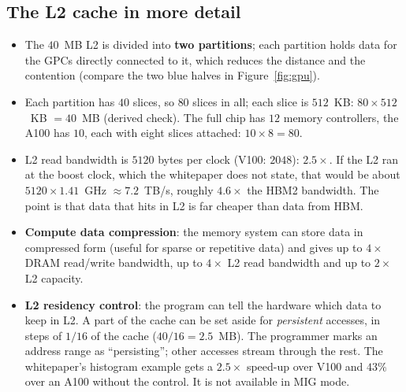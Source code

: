 \subsection{The L2 cache in more detail}
\begin{itemize}
  \item The $40$~MB L2 is divided into \textbf{two partitions}; each partition holds data for the GPCs directly connected to it, which reduces the distance and the contention (compare the two blue halves in Figure~\ref{fig:gpu}).
  \item Each partition has $40$ slices, so $80$ slices in all; each slice is $512$~KB: $80\times512$~KB $=40$~MB (derived check). The full chip has $12$ memory controllers, the A100 has $10$, each with eight slices attached: $10\times8=80$.
  \item L2 read bandwidth is $5120$ bytes per clock (V100: $2048$): $2.5\times$. If the L2 ran at the boost clock, which the whitepaper does not state, that would be about $5120\times1.41$~GHz $\approx7.2$~TB/s, roughly $4.6\times$ the HBM2 bandwidth. The point is that data that hits in L2 is far cheaper than data from HBM.
  \item \textbf{Compute data compression}: the memory system can store data in compressed form (useful for sparse or repetitive data) and gives up to $4\times$ DRAM read/write bandwidth, up to $4\times$ L2 read bandwidth and up to $2\times$ L2 capacity.
  \item \textbf{L2 residency control}: the program can tell the hardware which data to keep in L2. A part of the cache can be set aside for \emph{persistent} accesses, in steps of $1/16$ of the cache ($40/16=2.5$~MB). The programmer marks an address range as ``persisting''; other accesses stream through the rest. The whitepaper's histogram example gets a $2.5\times$ speed-up over V100 and $43\%$ over an A100 without the control. It is not available in MIG mode.
\end{itemize}

